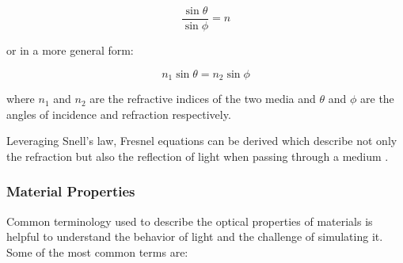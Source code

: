\begin{equation}
  \label{eqn:snells-law}
  \frac{\sin \theta}{\sin \phi} = n
\end{equation}

or in a more general form:

\begin{equation}
  \label{eqn:snells-law-general}
  n_1 \sin \theta = n_2 \sin \phi
\end{equation}

where $n_1$ and $n_2$ are the refractive indices of the two media and $\theta$ and $\phi$ are the angles of incidence and refraction respectively.

Leveraging Snell's law, Fresnel equations can be derived which describe not only the refraction but also the reflection of light when passing through a medium \cite{fowles1989introduction}.

\subsubsection{Material Properties}

Common terminology used to describe the optical properties of materials is helpful to understand the behavior of light and the challenge of simulating it. Some of the most common terms are:

